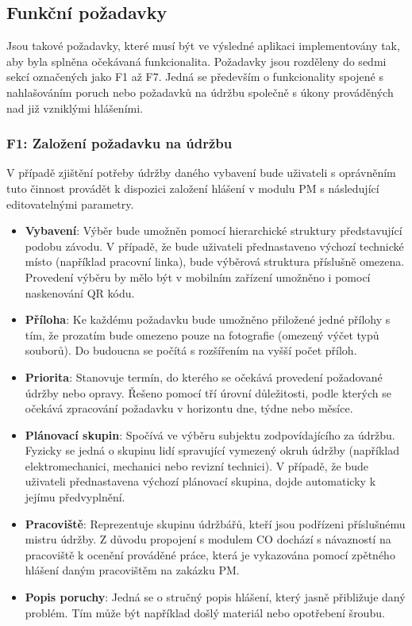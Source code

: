 \documentclass[thesis=M,czech]{FITthesis}[2012/06/26]
\begin{document}
\subsection{Funkční požadavky}
\label{ssec:funkcni_pozadavky}
Jsou takové požadavky, které musí být ve výsledné aplikaci implementovány tak, aby byla splněna očekávaná funkcionalita. Požadavky jsou rozděleny do sedmi sekcí označených jako F1 až F7. Jedná se především o funkcionality spojené s nahlašováním poruch nebo požadavků na údržbu společně s úkony prováděných nad již vzniklými hlášeními. 
\subsubsection{F1: Založení požadavku na údržbu}
\label{sssec:fc_zalozeni_pozadavku}
V případě zjištění potřeby údržby daného vybavení bude uživateli s oprávněním tuto činnost provádět k dispozici založení hlášení v modulu PM s následující editovatelnými parametry.
\begin{itemize}
	\item
	\textbf{Vybavení}: Výběr bude umožněn pomocí hierarchické struktury představující podobu závodu. V případě, že bude uživateli přednastaveno výchozí technické místo (například pracovní linka), bude výběrová struktura příslušně omezena. Provedení výběru by mělo být v mobilním zařízení umožněno i pomocí naskenování QR kódu.  
	\item
	\textbf{Příloha}: Ke každému požadavku bude umožněno přiložené jedné přílohy s tím, že prozatím bude omezeno pouze na fotografie (omezený výčet typů souborů). Do budoucna se počítá s rozšířením na vyšší počet příloh.  
	\item
	\textbf{Priorita}: Stanovuje termín, do kterého se očekává provedení požadované údržby nebo opravy. Řešeno pomocí tří úrovní důležitosti, podle kterých se očekává zpracování požadavku v horizontu dne, týdne nebo měsíce.
	\item
	\textbf{Plánovací skupin}: Spočívá ve výběru subjektu zodpovídajícího za údržbu. Fyzicky se jedná o skupinu lidí spravující vymezený okruh údržby (například elektromechanici, mechanici nebo revizní technici). V případě, že bude uživateli přednastavena výchozí plánovací skupina, dojde automaticky k jejímu předvyplnění.
	\item
	\textbf{Pracoviště}: Reprezentuje skupinu údržbářů, kteří jsou podřízeni příslušnému mistru údržby. Z důvodu propojení s modulem CO dochází s návazností na pracoviště k ocenění prováděné práce, která je vykazována pomocí zpětného hlášení daným pracovištěm na zakázku PM. 
	\item
	\textbf{Popis poruchy}: Jedná se o stručný popis hlášení, který jasně přibližuje daný problém. Tím může být například došlý materiál nebo opotřebení šroubu. 
\end{itemize} 
\end{document}
